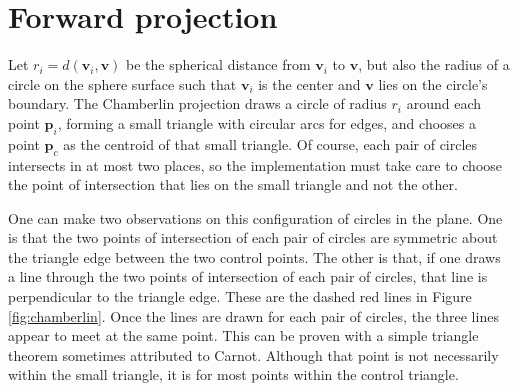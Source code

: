 \documentclass[]{interact}
\begin{document}
\section{Forward projection}

Let $r_i = d\left(\mathbf v_i, \mathbf v\right)$ be the spherical distance from
$\mathbf v_i$ to $\mathbf v$, but also the radius of a circle on the sphere
surface such that $\mathbf v_i$ is the center and $\mathbf v$ lies on the
circle's boundary. The Chamberlin projection draws a circle of radius $r_i$
around each point $\mathbf p_i$, forming a small triangle with circular arcs for
edges, and chooses a point $\mathbf p_c$ as the centroid of that small triangle.
Of course, each pair of circles intersects in at most two places, so the
implementation must take care to choose the point of intersection that
lies on the small triangle and not the other.

One can make two observations on this configuration of circles in the plane. One
is that the two points of intersection of each pair of circles are symmetric
about the triangle edge between the two control points. The other is that, if
one draws a line through the two points of intersection of each pair of circles,
that line is perpendicular to the triangle edge. These are the dashed red lines
in Figure \ref{fig:chamberlin}. Once the lines are drawn for each pair of
circles, the three lines appear to meet at the same point.
This can be proven with a simple triangle theorem sometimes attributed to
Carnot.\citep{posamentier}\citep{wohlgemuth} Although that point is not
necessarily within the small triangle, it is for most points within the control
triangle.
\end{document}
